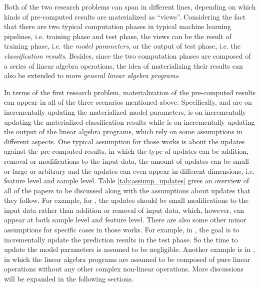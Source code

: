 Both of the two research problems can span in different lines, depending on which kinds of pre-computed results are materialized as ``views''. Considering the fact that there are two typical computation phases in typical machine learning pipelines, i.e. training phase and test phase, the views can be the result of training phase, i.e. the {\em model parameters}, or the output of test phase, i.e. the {\em classification results}. Besides, since the two computation phases are composed of a series of linear algebra operations, the idea of materializing their results can also be extended to more {\em general linear algebra programs}. 

In terms of the first research problem, materialization of the pre-computed results can appear in all of the three scenarios mentioned above. Specifically, \cite{deshpande2006mauvedb} and \cite{gupta2015processing} are on incrementally updating the materialized model parameters, \cite{koc2011incrementally} is on incrementally updating the materialized classification results while \cite{nikolic2014linview} is on incrementally updating the output of the linear algebra programs, which rely on some assumptions in different aspects. One typical assumption for those works is about the updates against the pre-computed results, in which the type of updates can be addition, removal or modifications to the input data, the amount of updates can be small or large or arbitrary and the updates can even appear in different dimensions, i.e. feature level and sample level. Table \ref{tab:assump_updates} gives an overview of all of the papers to be discussed along with the assumptions about updates that they follow. For example, for \cite{nikolic2014linview}, the updates should be small modifications to the input data rather than addition or removal of input data, which, however, can appear at both sample level and feature level. There are also some other minor assumptions for specific cases in those works. For example, in \cite{koc2011incrementally}, the goal is to incrementally update the prediction results in the test phase. So the time to update the model parameters is assumed to be negligible. Another example is in \cite{nikolic2014linview}, in which the linear algebra programs are assumed to be composed of pure linear operations without any other complex non-linear operations. More discussions will be expanded in the following sections.

